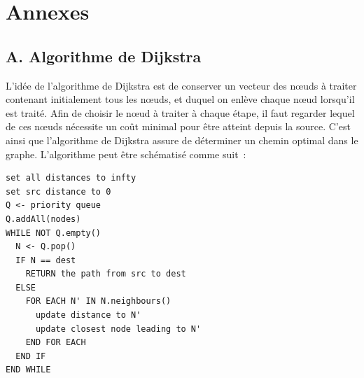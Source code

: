 \documentclass[10pt,journal,compsoc]{IEEEtran}
\begin{document}

\section*{Annexes}
  \subsection*{A. Algorithme de Dijkstra}
    L'idée de l'algorithme de Dijkstra est de conserver un vecteur des nœuds à traiter contenant initialement tous les nœuds, et duquel on enlève chaque nœud
    lorsqu'il est traité. Afin de choisir le nœud à traiter à chaque étape, il faut regarder lequel de ces nœuds nécessite un coût minimal pour être atteint
    depuis la source. C'est ainsi que l'algorithme de Dijkstra assure de déterminer un chemin optimal dans le graphe. L'algorithme peut être schématisé comme suit~:

\begin{verbatim}
set all distances to infty
set src distance to 0
Q <- priority queue
Q.addAll(nodes)
WHILE NOT Q.empty()
  N <- Q.pop()
  IF N == dest
    RETURN the path from src to dest
  ELSE
    FOR EACH N' IN N.neighbours()
      update distance to N'
      update closest node leading to N'
    END FOR EACH
  END IF
END WHILE
\end{verbatim}
\end{document}
